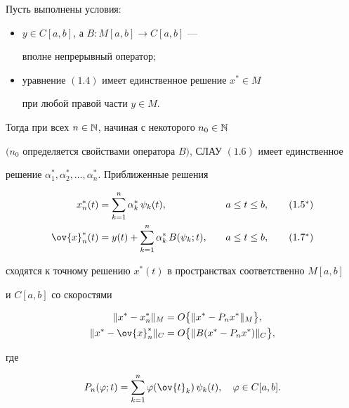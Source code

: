 \begin{thms}


Пусть выполнены условия\/${:}$


\begin{itemize}


\item[а)] $y\in C[a,b]$, а $B:M[a,b]\rightarrow C[a,b]$ ---


вполне непрерывный оператор\/$;$


\item[б)] уравнение $(1.4)$ имеет единственное решение $x^*\in M$ 


при любой правой части $y\in M$.


\end{itemize}


Тогда при всех $n\in \Bbb N$, начиная с некоторого $n_0\in \Bbb N$


$(n_0$ определяется свойствами оператора $B)$, СЛАУ $(1.6)$ имеет единственное


решение $\alpha_1^*,\alpha_2^*,\dotsc,\alpha_n^*$. Приближенные решения


\begin{alignat}{2}


x_n^*(t)&=\sum_{k=1}^n\alpha_k^*\, \psi_k(t),&\quad a&\leq t\leq b, 


\tag{$1.5^*$} \\


%


\ov{x}_n^*(t)&=y(t)+\sum_{k=1}^n\alpha_k^*\, B(\psi_k;t),


&\quad a&\leq t\leq b, \tag{$1.7^*$}


\end{alignat}


сходятся к точному решению $x^*(t)$ в пространствах соответственно $M[a,b]$


и $C[a,b]$ со скоростями


\begin{align}


\|x^*-x_n^*\|_M&=O\bigl\{ \|x^*-P_nx^*\|_M\bigr\}, \\


%


\|x^*-\ov{x}_n^*\|_C&=O\bigl\{ \|B(x^*-P_nx^*)\|_C\bigr\},


\end{align}


где


\begin{equation}


P_n(\varphi ;t)=\sum_{k=1}^n\varphi(\ov{t}_k)\, \psi_k(t),\quad


\varphi\in C[a,b].


\end{equation}


\end{thms}





